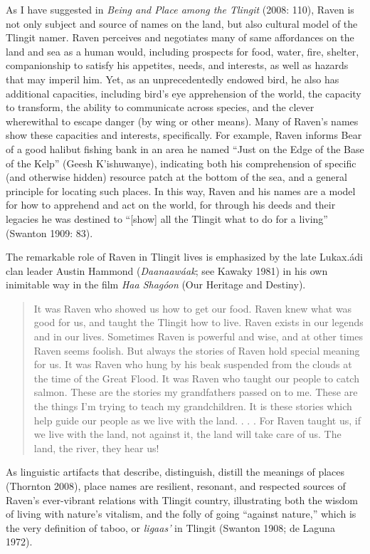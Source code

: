 As I have suggested in \textit{Being and Place among the Tlingit} (2008: 110), Raven is not only subject and source of names on the land, but also cultural model of the Tlingit namer. Raven perceives and negotiates many of same affordances on the land and sea as a human would, including prospects for food, water, fire, shelter, companionship to satisfy his appetites, needs, and interests, as well as hazards that may imperil him.  Yet, as an unprecedentedly endowed bird, he also has additional capacities, including bird’s eye apprehension of the world, the capacity to transform, the ability to communicate across species, and the clever wherewithal to escape danger (by wing or other means).  Many of Raven’s names show these capacities and interests, specifically. For example, Raven informs Bear of a good halibut fishing bank in an area he named “Just on the Edge of the Base of the Kelp” (Geesh K’ishuwanye), indicating both his comprehension of specific (and otherwise hidden) resource patch at the bottom of the sea, and a general principle for locating such places. In this way, Raven and his names are a model for how to apprehend and act on the world, for through his deeds and their legacies he was destined to “[show] all the Tlingit what to do for a living” (Swanton 1909: 83).

The remarkable role of Raven in Tlingit lives is emphasized by the late Lukax.ádi clan leader Austin Hammond (\textit{Daanaawáak}; see Kawaky 1981) in his own inimitable way in the film \textit{Haa Shagóon} (Our Heritage and Destiny).

\begin{quote}It was Raven who showed us how to get our food. Raven knew what was good for us, and taught the Tlingit how to live. Raven exists in our legends and in our lives. Sometimes Raven is powerful and wise, and at other times Raven seems foolish. But always the stories of Raven hold special meaning for us. It was Raven who hung by his beak suspended from the clouds at the time of the Great Flood. It was Raven who taught our people to catch salmon. These are the stories my grandfathers passed on to me. These are the things I’m trying to teach my grandchildren. It is these stories which help guide our people as we live with the land. . . . For Raven taught us, if we live with the land, not against it, the land will take care of us. The land, the river, they hear us!
\end{quote}
\noindent
As linguistic artifacts that describe, distinguish, distill the meanings of places (Thornton 2008), place names are resilient, resonant, and respected sources of Raven’s ever-vibrant relations with Tlingit country, illustrating both the wisdom of living with nature’s vitalism, and the folly of going “against nature,” which is the very definition of taboo, or \textit{ligaas’} in Tlingit (Swanton 1908; de Laguna 1972).


